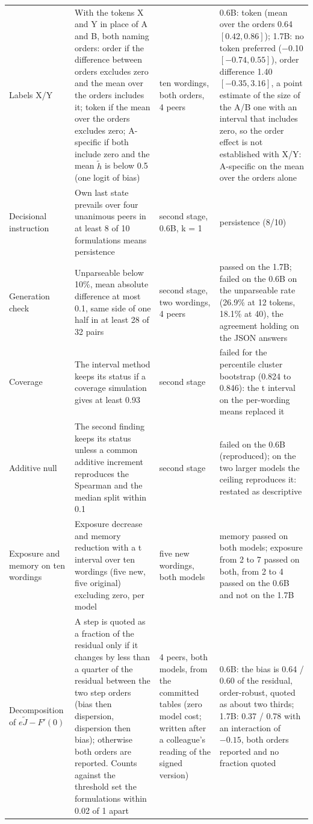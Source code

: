 \documentclass[11pt]{article}
\begin{document}
\begin{longtable}{p{2.2cm}p{5cm}p{2.3cm}p{5.5cm}}
Labels X/Y & With the tokens X and Y in place of A and B, both naming orders: order if the difference between orders excludes zero and the mean over the orders includes it; token if the mean over the orders excludes zero; A-specific if both include zero and the mean $\tilde h$ is below 0.5 (one logit of bias) & ten wordings, both orders, 4 peers & 0.6B: token (mean over the orders 0.64 $[0.42, 0.86]$); 1.7B: no token preferred ($-$0.10 $[-0.74, 0.55]$), order difference 1.40 $[-0.35, 3.16]$, a point estimate of the size of the A/B one with an interval that includes zero, so the order effect is not established with X/Y: A-specific on the mean over the orders alone \\
Decisional instruction & Own last state prevails over four unanimous peers in at least 8 of 10 formulations means persistence & second stage, 0.6B, k = 1 & persistence (8/10) \\
Generation check & Unparseable below 10\%, mean absolute difference at most 0.1, same side of one half in at least 28 of 32 pairs & second stage, two wordings, 4 peers & passed on the 1.7B; failed on the 0.6B on the unparseable rate (26.9\% at 12 tokens, 18.1\% at 40), the agreement holding on the JSON answers \\
Coverage & The interval method keeps its status if a coverage simulation gives at least 0.93 & second stage & failed for the percentile cluster bootstrap (0.824 to 0.846): the t interval on the per-wording means replaced it \\
Additive null & The second finding keeps its status unless a common additive increment reproduces the Spearman and the median split within 0.1 & second stage & failed on the 0.6B (reproduced); on the two larger models the ceiling reproduces it: restated as descriptive \\
Exposure and memory on ten wordings & Exposure decrease and memory reduction with a t interval over ten wordings (five new, five original) excluding zero, per model & five new wordings, both models & memory passed on both models; exposure from 2 to 7 passed on both, from 2 to 4 passed on the 0.6B and not on the 1.7B \\
Decomposition of $e\tilde J - F'(0)$ & A step is quoted as a fraction of the residual only if it changes by less than a quarter of the residual between the two step orders (bias then dispersion, dispersion then bias); otherwise both orders are reported. Counts against the threshold set the formulations within 0.02 of 1 apart & 4 peers, both models, from the committed tables (zero model cost; written after a colleague's reading of the signed version) & 0.6B: the bias is 0.64 / 0.60 of the residual, order-robust, quoted as about two thirds; 1.7B: 0.37 / 0.78 with an interaction of $-0.15$, both orders reported and no fraction quoted \\
\bottomrule
\end{longtable}
\normalsize
\end{document}
